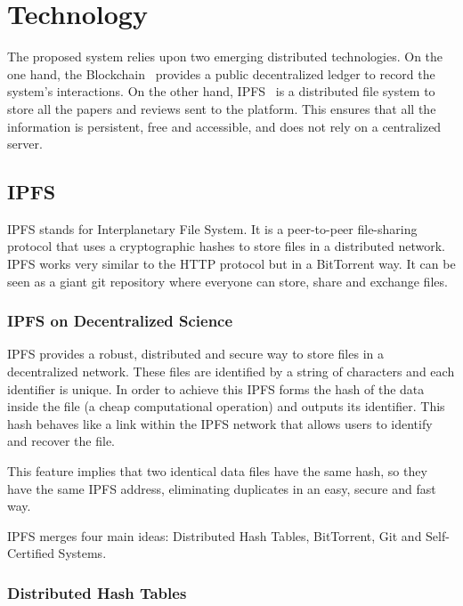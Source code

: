 \section{Technology}
\label{tech}

The proposed system relies upon two emerging distributed technologies. On the
one hand, the Blockchain~\cite{buterin2014ethereum} provides a public
decentralized ledger to record the system's interactions. On the other hand,
IPFS~\cite{benet_ipfs-content_2014} is a distributed file system to store all
the papers and reviews sent to the platform. This ensures that all the
information is persistent, free and accessible, and does not rely on a
centralized server.

\subsection{IPFS}
\label{tech:sec:ipfs}

IPFS stands for Interplanetary File System. It is a peer-to-peer file-sharing
protocol that uses a cryptographic hashes to store files in a distributed
network. IPFS works very similar to the HTTP protocol but in a BitTorrent way.
It can be seen as a giant git repository where everyone can store, share and
exchange files\cite{benet2014ipfs}.

\subsubsection*{IPFS on Decentralized Science}

IPFS provides a robust, distributed and secure way to store files in a
decentralized network. These files are identified by a string of characters and
each identifier is unique. In order to achieve this IPFS forms the hash of the
data inside the file (a cheap computational operation) and outputs its
identifier. This hash behaves like a link within the IPFS network that allows
users to identify and recover the file.

This feature implies that two identical data files have the same hash, so they
have the same IPFS address, eliminating duplicates in an easy, secure and fast
way.

IPFS merges four main ideas: Distributed Hash Tables, BitTorrent, Git and
Self-Certified Systems.

\subsubsection*{Distributed Hash Tables}
\label{tech:sec:ipfs:dht}

